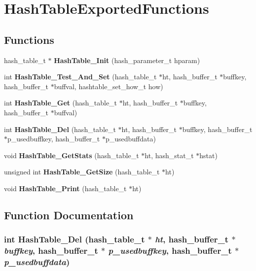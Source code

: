 \section{Hash\-Table\-Exported\-Functions}
\label{group__HashTableExportedFunctions}
\subsection*{Functions}
\begin{CompactItemize}
\item 
hash\_\-table\_\-t $\ast$ {\bf Hash\-Table\_\-Init} (hash\_\-parameter\_\-t hparam)
\item 
int {\bf Hash\-Table\_\-Test\_\-And\_\-Set} (hash\_\-table\_\-t $\ast$ht, hash\_\-buffer\_\-t $\ast$buffkey, hash\_\-buffer\_\-t $\ast$buffval, hashtable\_\-set\_\-how\_\-t how)
\item 
int {\bf Hash\-Table\_\-Get} (hash\_\-table\_\-t $\ast$ht, hash\_\-buffer\_\-t $\ast$buffkey, hash\_\-buffer\_\-t $\ast$buffval)
\item 
int {\bf Hash\-Table\_\-Del} (hash\_\-table\_\-t $\ast$ht, hash\_\-buffer\_\-t $\ast$buffkey, hash\_\-buffer\_\-t $\ast$p\_\-usedbuffkey, hash\_\-buffer\_\-t $\ast$p\_\-usedbuffdata)
\item 
void {\bf Hash\-Table\_\-Get\-Stats} (hash\_\-table\_\-t $\ast$ht, hash\_\-stat\_\-t $\ast$hstat)
\item 
unsigned int {\bf Hash\-Table\_\-Get\-Size} (hash\_\-table\_\-t $\ast$ht)
\item 
void {\bf Hash\-Table\_\-Print} (hash\_\-table\_\-t $\ast$ht)
\end{CompactItemize}


\subsection{Function Documentation}
\subsubsection{\setlength{\rightskip}{0pt plus 5cm}int Hash\-Table\_\-Del (hash\_\-table\_\-t $\ast$ {\em ht}, hash\_\-buffer\_\-t $\ast$ {\em buffkey}, hash\_\-buffer\_\-t $\ast$ {\em p\_\-usedbuffkey}, hash\_\-buffer\_\-t $\ast$ {\em p\_\-usedbuffdata})}\label{group__HashTableExportedFunctions_ga3}


